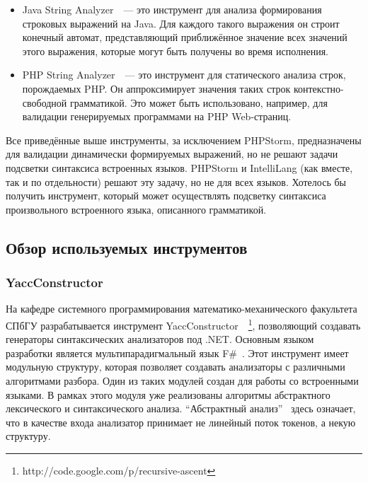 \begin{itemize}
{
    Alvor\footnote{https://code.google.com/p/alvor}~--- это плагин к среде разработки Eclipse, который проверяет корректность встроенных SQL-выражений в код на Java. Ищет динамические выражения на SQL и проверяет их на соответствие SQL-грамматике. В случае, когда SQL-запросы содержат синтаксические и семантические ошибки, Alvor подчёркивает соответствующие места в исходном коде и выводит информацию об ошибках до запуска программы. 
}
\item 
{
    Java String Analyzer~\cite{JSA}~--- это инструмент для анализа формирования строковых выражений на Java. Для каждого такого выражения он строит конечный автомат, представляющий приближённое значение всех значений этого выражения, которые могут быть получены во время исполнения. 
}
\item
{
PHP String Analyzer~\cite{PSA}~--- это инструмент для статического анализа строк, порождаемых PHP. Он аппроксимирует значения таких строк контекстно-свободной грамматикой. Это может быть использовано, например, для валидации генерируемых программами на PHP Web-страниц. 
}
\end{itemize}

Все приведённые выше инструменты, за исключением PHPStorm, предназначены для валидации динамически формируемых выражений, но не решают задачи подсветки синтаксиса встроенных языков. PHPStorm и IntelliLang (как вместе, так и по отдельности) решают эту задачу, но не для всех языков. Хотелось бы получить инструмент, который может осуществлять подсветку синтаксиса произвольного встроенного языка, описанного грамматикой.

\subsection{Обзор используемых инструментов}

\subsubsection{YaccConstructor}
На кафедре системного программирования математико-механического факультета СПбГУ разрабатывается инструмент YaccConstructor~\cite{YC_paper}~\footnote{http://code.google.com/p/recursive-ascent}, позволяющий создавать генераторы синтаксических анализаторов под .NET. Основным языком разработки является мультипарадигмальный язык F\#~\cite{FSharp}. Этот инструмент имеет модульную структуру, которая позволяет создавать анализаторы с различными алгоритмами разбора. Один из таких модулей создан для работы со встроенными языками. В рамках этого модуля уже реализованы алгоритмы абстрактного лексического и синтаксического анализа. ``Абстрактный анализ''~\cite{ARNGLR} здесь означает, что в качестве входа анализатор принимает не линейный поток токенов, а некую структуру. 

